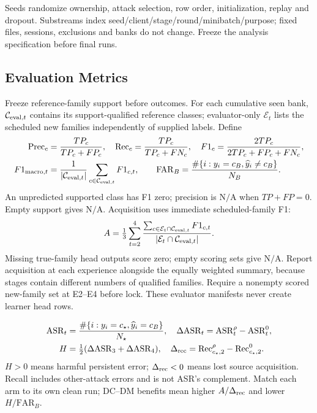 \documentclass[10pt,a4paper]{article}
\newcommand{\NA}{\mathrm{N/A}}
\begin{document}
Seeds randomize ownership, attack selection, row order, initialization, replay and dropout. Substreams index seed/client/stage/round/minibatch/purpose; fixed files, sessions, exclusions and banks do not change. Freeze the analysis specification before final runs.

\subsection{Evaluation Metrics}
Freeze reference-family support before outcomes. For each cumulative seen bank, $\mathcal C_{{\rm eval},t}$ contains its support-qualified reference classes; evaluator-only $\mathcal E_t$ lists the scheduled new families independently of supplied labels. Define
\begin{equation}
\begin{aligned}
\mathrm{Prec}_c&=\frac{TP_c}{TP_c+FP_c},\quad\mathrm{Rec}_c=\frac{TP_c}{TP_c+FN_c},\quad
F1_c=\frac{2TP_c}{2TP_c+FP_c+FN_c},\\
F1_{{\rm macro},t}&=\frac1{|\mathcal C_{{\rm eval},t}|}\sum_{c\in\mathcal C_{{\rm eval},t}}F1_{c,t},\qquad
\mathrm{FAR}_B=\frac{\#\{i:y_i=c_B,\widehat y_i\ne c_B\}}{N_B}.
\end{aligned}
\label{eq:metrics}
\end{equation}
An unpredicted supported class has F1 zero; precision is $\NA$ when $TP+FP=0$. Empty support gives $\NA$. Acquisition uses immediate scheduled-family F1:
\begin{equation}
A=\tfrac13\sum_{t=2}^4\frac{\sum_{c\in\mathcal E_t\cap\mathcal C_{{\rm eval},t}}F1_{c,t}}{|\mathcal E_t\cap\mathcal C_{{\rm eval},t}|}.
\label{eq:acquisition}
\end{equation}
Missing true-family head outputs score zero; empty scoring sets give $\NA$. Report acquisition at each experience alongside the equally weighted summary, because stages contain different numbers of qualified families.
Require a nonempty scored new-family set at E2--E4 before lock. These evaluator manifests never create learner head rows.

\begin{equation}
\begin{aligned}
\mathrm{ASR}_t&=\frac{\#\{i:y_i=c_\star,\widehat y_i=c_B\}}{N_\star},\quad
\Delta\mathrm{ASR}_t=\mathrm{ASR}^{\rho}_t-\mathrm{ASR}^{0}_t,\\
H&=\tfrac12(\Delta\mathrm{ASR}_3+\Delta\mathrm{ASR}_4),\quad
\Delta_{\rm rec}=\mathrm{Rec}^{\rho}_{c_\star,2}-\mathrm{Rec}^{0}_{c_\star,2}.
\end{aligned}
\label{eq:asr}
\end{equation}
$H>0$ means harmful persistent error; $\Delta_{\rm rec}<0$ means lost source acquisition. Recall includes other-attack errors and is not ASR's complement. Match each arm to its own clean run; DC--DM benefits mean higher $A/\Delta_{\rm rec}$ and lower $H/\mathrm{FAR}_B$.
\end{document}
